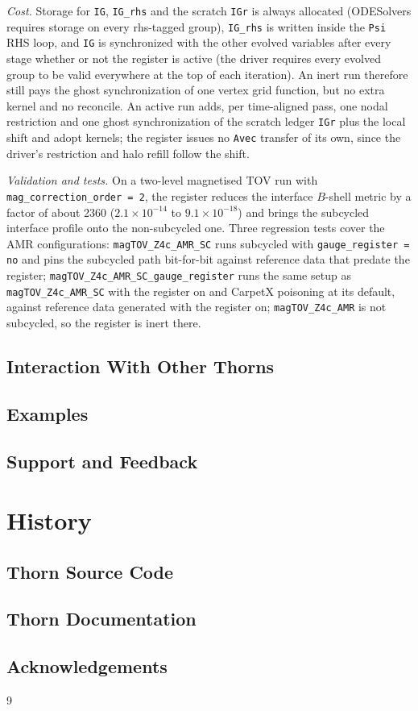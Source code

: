 \emph{Cost.} Storage for \texttt{IG}, \texttt{IG\_rhs} and the scratch
\texttt{IGr} is always allocated (ODESolvers requires storage on every
rhs-tagged group), \texttt{IG\_rhs} is written inside the \texttt{Psi} RHS
loop, and \texttt{IG} is synchronized with the other evolved variables after
every stage whether or not the register is active (the driver requires every
evolved group to be valid everywhere at the top of each iteration). An inert
run therefore still pays the ghost synchronization of one vertex grid
function, but no extra kernel and no reconcile. An active run adds, per
time-aligned pass, one nodal restriction and one ghost synchronization of the
scratch ledger \texttt{IGr} plus the local shift and adopt kernels; the
register issues no \texttt{Avec} transfer of its own, since the driver's
restriction and halo refill follow the shift.

\emph{Validation and tests.} On a two-level magnetised TOV run with
\texttt{mag\_correction\_order = 2}, the register reduces the interface
$B$-shell metric by a factor of about 2360 ($2.1\times10^{-14}$ to
$9.1\times10^{-18}$) and brings the subcycled interface profile onto the
non-subcycled one. Three regression tests cover the AMR configurations:
\texttt{magTOV\_Z4c\_AMR\_SC} runs subcycled with \texttt{gauge\_register = no}
and pins the subcycled path bit-for-bit against reference data that predate
the register;
\texttt{magTOV\_Z4c\_AMR\_SC\_gauge\_register} runs the same setup as
\texttt{magTOV\_Z4c\_AMR\_SC} with the register on and CarpetX poisoning at
its default, against reference data generated with the register on;
\texttt{magTOV\_Z4c\_AMR} is not subcycled, so the register is inert there.

\subsection{Interaction With Other Thorns}

\subsection{Examples}

\subsection{Support and Feedback}

\section{History}

\subsection{Thorn Source Code}

\subsection{Thorn Documentation}

\subsection{Acknowledgements}


\begin{thebibliography}{9}

\end{thebibliography}



